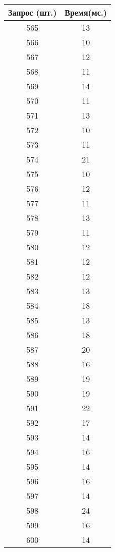 \begin{table}[H]
\begin{minipage}{.4\textwidth}
		\begin{tabular}{|c|c|}
			\hline
			Запрос (шт.)& Время(мс.) \\
			\hline
			565 & 13 \\
			566 & 10 \\
			567 & 12 \\
			568 & 11 \\
			569 & 14 \\
			570 & 11 \\
			571 & 13 \\
			572 & 10 \\
			573 & 11 \\
			574 & 21 \\
			575 & 10 \\
			576 & 12 \\
			577 & 11 \\
			578 & 13 \\
			579 & 11 \\
			580 & 12 \\
			581 & 12 \\
			582 & 12 \\
			583 & 13 \\
			584 & 18 \\
			585 & 13 \\
			586 & 18 \\
			587 & 20 \\
			588 & 16 \\
			589 & 19 \\
			590 & 19 \\
			591 & 22 \\
			592 & 17 \\
			593 & 14 \\
			594 & 16 \\
			595 & 14 \\
			596 & 16 \\
			597 & 14 \\
			598 & 24 \\
			599 & 16 \\
			600 & 14 \\
			\hline
		\end{tabular}
		\label{tab:с256}
	\end{minipage}
\end{table}

